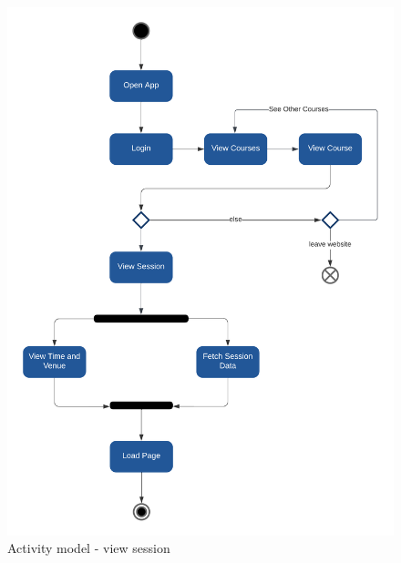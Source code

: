\begin{figure}[H]
    \centerline{\includegraphics[width=150mm,scale=1]{figures/analysis_and_design/analysis/1. View Session.png}}
    \caption{Activity model - view session}
    \label{viewSession}
\end{figure}


